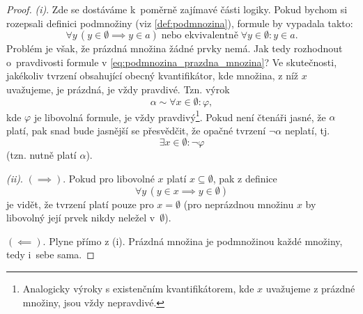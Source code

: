 \begin{proof}
    \textit{(i)}. Zde se dostáváme k~poměrně zajímavé části logiky. Pokud bychom si rozepsali definici podmnožiny (viz \ref{def:podmnozina}), formule by vypadala takto:
    \begin{equation}\label{eq:podmnozina_prazdna_mnozina}
        \forall y\,(y\in\emptyset \implies y\in a)\;\text{nebo ekvivalentně}\;\forall y\in\emptyset: y\in a.
    \end{equation}
    Problém je však, že prázdná množina žádné prvky nemá. Jak tedy rozhodnout o~pravdivosti formule v \eqref{eq:podmnozina_prazdna_mnozina}? Ve skutečnosti, jakékoliv tvrzení obsahující obecný kvantifikátor, kde množina, z níž $x$ uvažujeme, je prázdná, je vždy pravdivé. Tzn. výrok
    \begin{equation*}
        \alpha\sim\forall x\in\emptyset: \varphi,
    \end{equation*}
    kde $\varphi$ je libovolná formule, je vždy pravdivý\footnote{Analogicky výroky s existenčním kvantifikátorem, kde $x$ uvažujeme z prázdné množiny, jsou vždy nepravdivé.}. Pokud není čtenáři jasné, že $\alpha$ platí, pak snad bude jasnější se přesvědčit, že opačné tvrzení $\neg\alpha$ neplatí, tj.
    \begin{equation*}
        \exists x\in\emptyset: \neg\varphi
    \end{equation*}
    (tzn. nutně platí $\alpha$).\par
    \textit{(ii)}. \textit{$(\implies)$}. Pokud pro libovolné $x$ platí $x\subseteq\emptyset$, pak z definice
    \begin{equation*}
        \forall y\,(y\in x \implies y\in\emptyset)
    \end{equation*}
    je vidět, že tvrzení platí pouze pro $x=\emptyset$ (pro neprázdnou množinu $x$ by libovolný její prvek nikdy neležel v~$\emptyset$).\par
    \textit{$(\impliedby)$}. Plyne přímo z (i). Prázdná množina je podmnožinou každé množiny, tedy i~sebe sama.
\end{proof}

